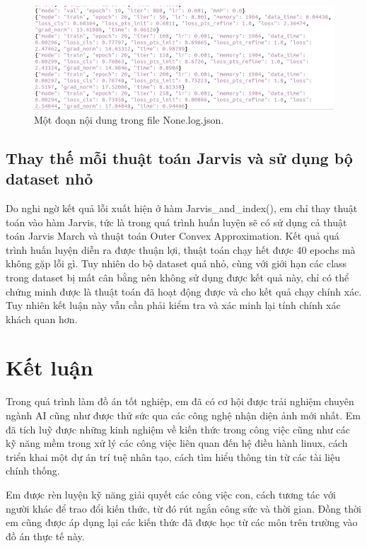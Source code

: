 \documentclass[12pt,a4paper,openany,oneside]{report}
\begin{document}
\begin{figure}[ht!]
	\begin{center}
		\includegraphics[width=450px]{./ket_qua_file_none_log_json.JPG}
		\caption{Một đoạn nội dung trong file None.log.json.}
		\label{ket_qua_file_none_log_json}
	\end{center}
\end{figure} 
\section{Thay thế mỗi thuật toán Jarvis và sử dụng bộ dataset nhỏ}
Do nghi ngờ kết quả lỗi xuất hiện ở hàm Jarvis\_and\_index(), em chỉ thay thuật toán vào hàm Jarvis, tức là trong quá trình huấn luyện sẽ có sử dụng cả thuật toán Jarvis March và thuật toán Outer Convex Approximation. Kết quả quá trình huấn luyện diễn ra được thuận lợi, thuật toán chạy hết được 40 epochs mà không gặp lỗi gì. Tuy nhiên do bộ dataset quá nhỏ, cùng với giới hạn các class trong dataset bị mất cân bằng nên không sử dụng được kết quả này, chỉ có thể chứng minh được là thuật toán đã hoạt động được và cho kết quả chạy chính xác. Tuy nhiên kết luận này vẫn cần phải kiểm tra và xác minh lại tính chính xác khách quan hơn. 
\chapter*{{Kết luận}}

Trong quá trình làm đồ án tốt nghiệp, em đã có cơ hội được trải nghiệm chuyên ngành AI cũng như được thử sức qua các công nghệ nhận diện ảnh mới nhất. Em đã tích luỹ được những kinh nghiệm về kiến thức trong công việc cũng như các kỹ năng mềm trong xử lý các công việc liên quan đến hệ điều hành linux, cách triển khai một dự án trí tuệ nhân tạo, cách tìm hiểu thông tin từ các tài liệu chính thống.
 
Em được rèn luyện kỹ năng giải quyết các công việc con, cách tương tác với người khác để trao đổi kiến thức, từ đó rút ngắn công sức và thời gian. Đồng thời em cũng được áp dụng lại các kiến thức đã được học từ các môn trên trường vào đồ án thực tế này.
\end{document}
